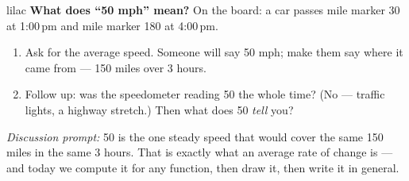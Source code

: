 \documentclass[10pt]{article}
\begin{document}
\begin{skillbox}{lilac}
    \textbf{What does ``50 mph'' mean?} On the board: a car passes mile marker 30 at
    1:00\,pm and mile marker 180 at 4:00\,pm.
    \begin{enumerate}[itemsep=2pt]
        \item Ask for the average speed. Someone will say 50 mph; make them say where it
              came from --- 150 miles over 3 hours.
        \item Follow up: was the speedometer reading 50 the whole time? (No --- traffic
              lights, a highway stretch.) Then what does 50 \emph{tell} you?
    \end{enumerate}
    \textit{Discussion prompt:} 50 is the one steady speed that would cover the same 150 miles
    in the same 3 hours. That is exactly what an average rate of change is --- and today we
    compute it for any function, then draw it, then write it in general.
\end{skillbox}
\end{document}
